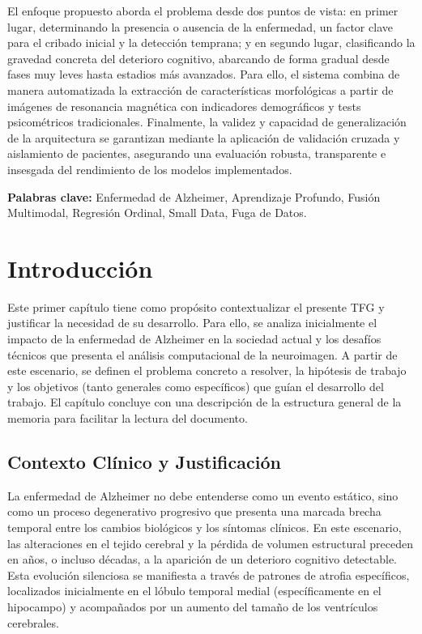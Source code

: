 \documentclass[12pt, oneside, english, spanish]{book}
\begin{document}
El enfoque propuesto aborda el problema desde dos puntos de vista: en primer lugar, determinando la presencia o ausencia de la enfermedad, un factor clave para el cribado inicial y la detección temprana; y en segundo lugar, clasificando la gravedad concreta del deterioro cognitivo, abarcando de forma gradual desde fases muy leves hasta estadios más avanzados. Para ello, el sistema combina de manera automatizada la extracción de características morfológicas a partir de imágenes de resonancia magnética con indicadores demográficos y tests psicométricos tradicionales. Finalmente, la validez y capacidad de generalización de la arquitectura se garantizan mediante la aplicación de validación cruzada y aislamiento de pacientes, asegurando una evaluación robusta, transparente e insesgada del rendimiento de los modelos implementados.

\vspace{0.5cm}
\noindent \textbf{Palabras clave:} Enfermedad de Alzheimer, Aprendizaje Profundo, Fusión Multimodal, Regresión Ordinal, Small Data, Fuga de Datos.


\mainmatter

\chapter{Introducción} \label{chap:introduccion}

Este primer capítulo tiene como propósito contextualizar el presente TFG y justificar la necesidad de su desarrollo. Para ello, se analiza inicialmente el impacto de la enfermedad de Alzheimer en la sociedad actual y los desafíos técnicos que presenta el análisis computacional de la neuroimagen. A partir de este escenario, se definen el problema concreto a resolver, la hipótesis de trabajo y los objetivos (tanto generales como específicos) que guían el desarrollo del trabajo. El capítulo concluye con una descripción de la estructura general de la memoria para facilitar la lectura del documento.

\section{Contexto Clínico y Justificación} \label{sec:contexto_justificacion}

La enfermedad de Alzheimer no debe entenderse como un evento estático, sino como un proceso degenerativo progresivo que presenta una marcada brecha temporal entre los cambios biológicos y los síntomas clínicos. En este escenario, las alteraciones en el tejido cerebral y la pérdida de volumen estructural preceden en años, o incluso décadas, a la aparición de un deterioro cognitivo detectable. Esta evolución silenciosa se manifiesta a través de patrones de atrofia específicos, localizados inicialmente en el lóbulo temporal medial (específicamente en el hipocampo) y acompañados por un aumento del tamaño de los ventrículos cerebrales.
\end{document}
